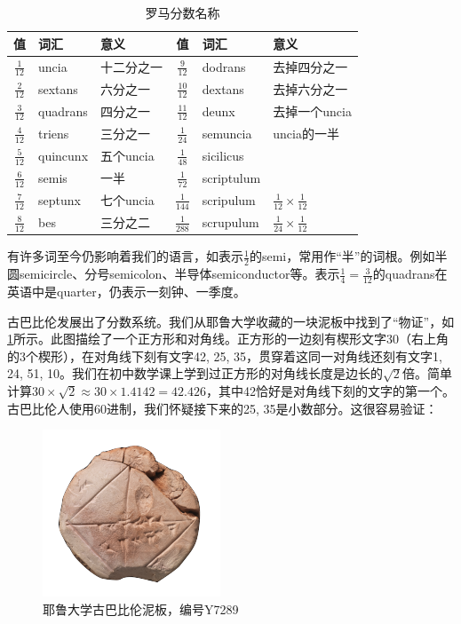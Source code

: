 \documentclass[b5paper]{ctexart}
\begin{document}
\begin{table}
  \centering
  \begin{tabular}{|c|l|l||c|l|l|}
  \hline
  值 & 词汇 & 意义 & 值 & 词汇 & 意义 \\
  \hline
  $\frac{1}{12}$ & uncia    & 十二分之一 & $\frac{9}{12}$ & dodrans    & 去掉四分之一 \\
  \hline
  $\frac{2}{12}$ & sextans  & 六分之一 & $\frac{10}{12}$ & dextans   & 去掉六分之一 \\
  \hline
  $\frac{3}{12}$ & quadrans & 四分之一 & $\frac{11}{12}$ & deunx    & 去掉一个uncia \\
  \hline
  $\frac{4}{12}$ & triens   & 三分之一 & $\frac{1}{24}$ & semuncia   & uncia的一半  \\
  \hline
  $\frac{5}{12}$ & quincunx & 五个uncia & $\frac{1}{48}$ & sicilicus &  \\
  \hline
  $\frac{6}{12}$ & semis    & 一半    & $\frac{1}{72}$ & scriptulum    &  \\
  \hline
  $\frac{7}{12}$ & septunx  & 七个uncia & $\frac{1}{144}$ & scripulum  &  $\frac{1}{12} \times \frac{1}{12}$ \\
  \hline
  $\frac{8}{12}$ & bes      & 三分之二 & $\frac{1}{288}$ & scrupulum    &  $\frac{1}{24} \times \frac{1}{12}$\\
  \hline
  \end{tabular}
  \caption{罗马分数名称}
  \label{tab:roman-fractions}
\end{table}

有许多词至今仍影响着我们的语言，如表示$\frac{1}{2}$的semi，常用作“半”的词根。例如半圆semicircle、分号semicolon、半导体semiconductor等。表示$\frac{1}{4} = \frac{3}{12}$的quadrans在英语中是quarter，仍表示一刻钟、一季度。

古巴比伦发展出了分数系统。我们从耶鲁大学收藏的一块泥板中找到了“物证”，如\cref{fig:babylonian-yale}所示。此图描绘了一个正方形和对角线。正方形的一边刻有楔形文字30（右上角的3个楔形），在对角线下刻有文字42, 25, 35，贯穿着这同一对角线还刻有文字1, 24, 51, 10。我们在初中数学课上学到过正方形的对角线长度是边长的$\sqrt{2}$倍。简单计算$30 \times \sqrt{2} \approx 30 \times 1.4142 = 42.426$，其中42恰好是对角线下刻的文字的第一个。古巴比伦人使用60进制，我们怀疑接下来的25, 35是小数部分。这很容易验证：

\begin{figure}[htbp]
 \centering
 \includegraphics[scale=0.8]{img/babylonian-yale}
 \caption{耶鲁大学古巴比伦泥板，编号Y7289}
 \label{fig:babylonian-yale}
\end{figure}
\end{document}
